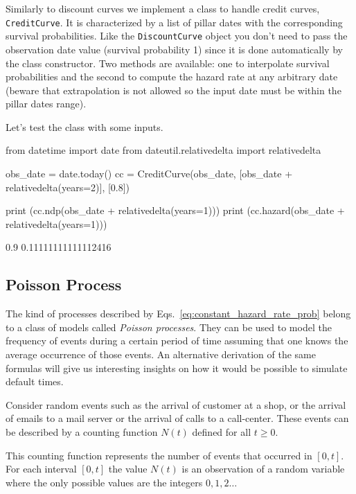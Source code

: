 \begin{finmarkets}
Similarly to discount curves we implement a class to handle credit curves, \texttt{CreditCurve}. It is characterized by a list of pillar dates with the corresponding survival probabilities. Like the \texttt{DiscountCurve} object you don't need to pass the observation date value (survival probability 1) since it is done automatically by the class constructor. Two methods are available: one to interpolate survival probabilities and the second to compute the hazard rate at any arbitrary date (beware that extrapolation is not allowed so the input date must be within the pillar dates range).
\end{finmarkets}


Let's test the class with some inputs.
\begin{ipythonnon}
from datetime import date
from dateutil.relativedelta import relativedelta

obs_date = date.today()
cc = CreditCurve(obs_date, [obs_date + relativedelta(years=2)], [0.8])

print (cc.ndp(obs_date + relativedelta(years=1)))
print (cc.hazard(obs_date + relativedelta(years=1)))
\end{ipythonnon}
\begin{ioutput}
0.9
0.11111111111112416
\end{ioutput}

\subsection{Poisson Process}
\label{sec:poisson_process}

The kind of processes described by Eqs.~\ref{eq:constant_hazard_rate_prob} belong to a class of models called \emph{Poisson processes}. 
They can be used to model the frequency of events during a certain period of time assuming that one knows the average occurrence of those events. An alternative derivation of the same formulas will give us interesting insights on how it would be possible to simulate default times.

Consider random events such as the arrival of customer at a shop, or the arrival of emails to a mail server or the arrival of calls to a call-center. These events can be described by a counting function $N(t)$ defined for all $t\ge 0$.

This counting function represents the number of events that occurred in $[0, t]$. For each interval $[0,t]$ the value $N(t)$ is an observation of a random variable where the only possible values are the integers $0, 1, 2\ldots$

